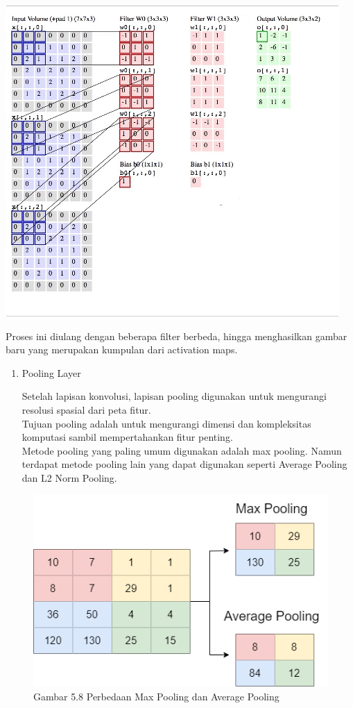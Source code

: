 \documentclass[
  letterpaper,
  DIV=11,
  numbers=noendperiod]{scrreprt}
\begin{document}
\includegraphics{Asset/conv2.gif}

Proses ini diulang dengan beberapa filter berbeda, hingga menghasilkan
gambar baru yang merupakan kumpulan dari activation maps.

\begin{enumerate}
\def\labelenumi{\alph{enumi})}
\setcounter{enumi}{1}
\item
  Pooling Layer

  Setelah lapisan konvolusi, lapisan pooling digunakan untuk mengurangi
  resolusi spasial dari peta fitur.\\
  Tujuan pooling adalah untuk mengurangi dimensi dan kompleksitas
  komputasi sambil mempertahankan fitur penting.\\
  Metode pooling yang paling umum digunakan adalah max pooling. Namun
  terdapat metode pooling lain yang dapat digunakan seperti Average
  Pooling dan L2 Norm Pooling.
\end{enumerate}

\begin{figure}

{\centering \includegraphics{Asset/pooling.png}

}

\caption{Gambar 5.8 Perbedaan Max Pooling dan Average Pooling}

\end{figure}
\end{document}
